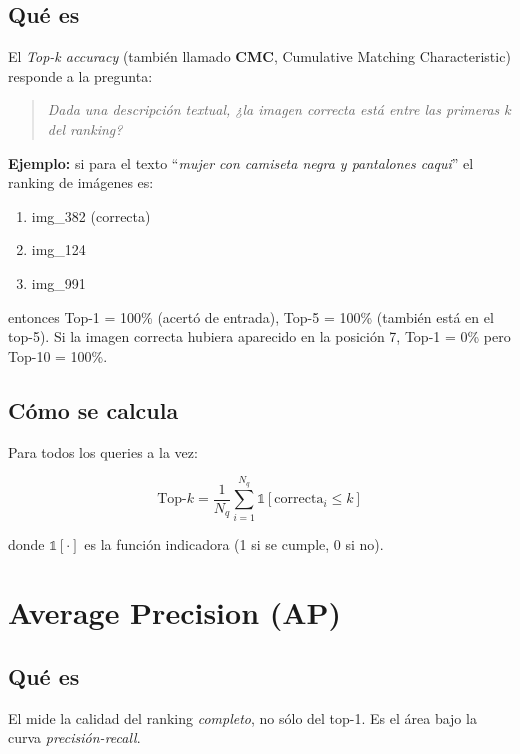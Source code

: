 \subsection*{Qué es}

El \emph{Top-k accuracy} (también llamado \textbf{CMC}, Cumulative
Matching Characteristic) responde a la pregunta:

\begin{quote}
\textit{Dada una descripción textual, ¿la imagen correcta está
entre las primeras $k$ del ranking?}
\end{quote}

\noindent\textbf{Ejemplo:} si para el texto ``\emph{mujer con
camiseta negra y pantalones caqui}'' el ranking de imágenes es:
\begin{enumerate}
  \item img\_382 (correcta)
  \item img\_124
  \item img\_991
\end{enumerate}

\noindent entonces Top-1 = 100\% (acertó de entrada), Top-5 = 100\%
(también está en el top-5). Si la imagen correcta hubiera
aparecido en la posición 7, Top-1 = 0\% pero Top-10 = 100\%.

\subsection*{Cómo se calcula}

Para todos los queries a la vez:

\begin{equation}
  \text{Top-}k = \frac{1}{N_q} \sum_{i=1}^{N_q}
                  \mathbb{1}[\text{correcta}_i \leq k]
  \label{eq:topk}
\end{equation}

\noindent donde $\mathbb{1}[\cdot]$ es la función indicadora (1 si
se cumple, 0 si no).

\section{Average Precision (AP)}

\subsection*{Qué es}

El  mide la calidad del ranking \emph{completo},
no sólo del top-1. Es el área bajo la curva
\emph{precisión-recall}.

